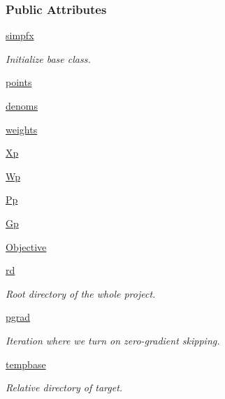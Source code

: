 \subsubsection*{Public Attributes}
\begin{DoxyCompactItemize}
\item 
\hyperlink{classforcebalance_1_1thermo_1_1Thermo_ab0c5f73c4c9812e2d733ffb0f65edeb9}{simpfx}
\begin{DoxyCompactList}\small\item\em Initialize base class. \end{DoxyCompactList}\item 
\hyperlink{classforcebalance_1_1thermo_1_1Thermo_a026babae21684ddf5751cf17a91c5588}{points}
\item 
\hyperlink{classforcebalance_1_1thermo_1_1Thermo_a2cfee647c0b5b8dd9f575d3a5d0b7d88}{denoms}
\item 
\hyperlink{classforcebalance_1_1thermo_1_1Thermo_a2821e61578dac23a40db4788abacda0f}{weights}
\item 
\hyperlink{classforcebalance_1_1thermo_1_1Thermo_a5d5c7cfd9aa3bbd85ff15cb476ba990b}{Xp}
\item 
\hyperlink{classforcebalance_1_1thermo_1_1Thermo_ace1a9dd4cc6b80f40a10d56309b30a01}{Wp}
\item 
\hyperlink{classforcebalance_1_1thermo_1_1Thermo_a542d45d19d3ac48f3c7f25c00fd9d839}{Pp}
\item 
\hyperlink{classforcebalance_1_1thermo_1_1Thermo_a2c052c89904a57ae487c1ff082e3f023}{Gp}
\item 
\hyperlink{classforcebalance_1_1thermo_1_1Thermo_ad0f733fe26b94c3d7b632d7257c91e78}{Objective}
\item 
\hyperlink{classforcebalance_1_1target_1_1Target_a4edb69fbde792e9f2f27e54b7c978c8e}{rd}
\begin{DoxyCompactList}\small\item\em Root directory of the whole project. \end{DoxyCompactList}\item 
\hyperlink{classforcebalance_1_1target_1_1Target_a684235b4332b608c4e2da22982c2fdfa}{pgrad}
\begin{DoxyCompactList}\small\item\em Iteration where we turn on zero-\/gradient skipping. \end{DoxyCompactList}\item 
\hyperlink{classforcebalance_1_1target_1_1Target_ae5b544d3e11365865813ef3d626ef81d}{tempbase}
\begin{DoxyCompactList}\small\item\em Relative directory of target. \end{DoxyCompactList}\item 

\end{DoxyCompactItemize}
